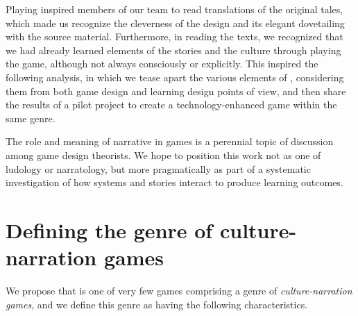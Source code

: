 \documentclass[a4paper]{article}
\begin{document}
Playing \totan{}  inspired members of our team to read translations
of the original tales, which made us recognize the cleverness of the design
and its elegant dovetailing with the source material.
Furthermore, in reading the texts, we recognized that we had already
learned elements of the stories and the culture through playing the game,
although not always consciously or explicitly.
This inspired the following analysis, in which we tease apart the
various elements of \totan{}, considering them from both game design
and learning design points of view, and then share the results of a pilot
project to create a technology-enhanced game within the same genre.

The role and meaning of narrative in games is a perennial topic
of discussion among game design theorists.
We hope to position this work not as one of ludology or narratology,
but more pragmatically as part of a systematic investigation of how
systems and stories interact to produce learning outcomes.

\section{Defining the genre of culture-narration games}

We propose that \totan{} is one of very few games comprising a genre
of \textit{culture-narration games}, and we define this genre as having
the following characteristics.
\end{document}
